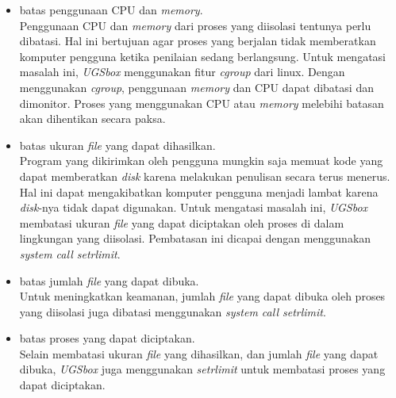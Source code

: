 \begin{itemize}
    \item batas penggunaan CPU dan \textit{memory}. \\ Penggunaan CPU dan \textit{memory} dari proses yang diisolasi tentunya perlu dibatasi. Hal ini bertujuan agar proses yang berjalan tidak memberatkan komputer pengguna ketika penilaian sedang berlangsung. Untuk mengatasi masalah ini, \textit{UGSbox} menggunakan fitur \textit{cgroup} dari linux. Dengan menggunakan \textit{cgroup}, penggunaan \textit{memory} dan CPU dapat dibatasi dan dimonitor. Proses yang menggunakan CPU atau \textit{memory} melebihi batasan akan dihentikan secara paksa. 

    \item batas ukuran \textit{file} yang dapat dihasilkan. \\ Program yang dikirimkan oleh pengguna mungkin saja memuat kode yang dapat memberatkan \textit{disk} karena melakukan penulisan secara terus menerus. Hal ini dapat mengakibatkan komputer pengguna menjadi lambat karena \textit{disk}-nya tidak dapat digunakan. Untuk mengatasi masalah ini, \textit{UGSbox} membatasi ukuran \textit{file} yang dapat diciptakan oleh proses di dalam lingkungan yang diisolasi. Pembatasan ini dicapai dengan menggunakan \textit{system call setrlimit}.

    \item batas jumlah \textit{file} yang dapat dibuka. \\ Untuk meningkatkan keamanan, jumlah \textit{file} yang dapat dibuka oleh proses yang diisolasi juga dibatasi menggunakan \textit{system call setrlimit}.

    \item batas proses yang dapat diciptakan. \\ Selain membatasi ukuran \textit{file} yang dihasilkan, dan jumlah \textit{file} yang dapat dibuka, \textit{UGSbox} juga menggunakan \textit{setrlimit} untuk membatasi proses yang dapat diciptakan.

\end{itemize}

